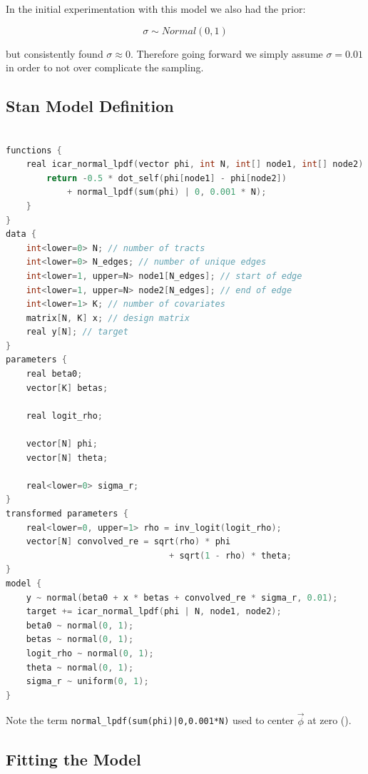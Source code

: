 \documentclass[11pt]{article}
\begin{document}
In the initial experimentation with this model we also had the prior:

$$\sigma \sim Normal(0,1)$$

but consistently found $\sigma \approx 0$. Therefore going forward we simply assume $\sigma=0.01$ in order to not over complicate the sampling. 

\newpage



\subsection{Stan Model Definition}\label{stanmodel}

\begin{lstlisting}[language=C++, basicstyle=\small]

functions {
    real icar_normal_lpdf(vector phi, int N, int[] node1, int[] node2) {
        return -0.5 * dot_self(phi[node1] - phi[node2]) 
            + normal_lpdf(sum(phi) | 0, 0.001 * N);
    }
}
data {
    int<lower=0> N; // number of tracts
    int<lower=0> N_edges; // number of unique edges
    int<lower=1, upper=N> node1[N_edges]; // start of edge
    int<lower=1, upper=N> node2[N_edges]; // end of edge
    int<lower=1> K; // number of covariates
    matrix[N, K] x; // design matrix
    real y[N]; // target
}
parameters {
    real beta0;
    vector[K] betas;

    real logit_rho;

    vector[N] phi;
    vector[N] theta;

    real<lower=0> sigma_r;
}
transformed parameters {
    real<lower=0, upper=1> rho = inv_logit(logit_rho);
    vector[N] convolved_re = sqrt(rho) * phi 
                                + sqrt(1 - rho) * theta;
}
model {
    y ~ normal(beta0 + x * betas + convolved_re * sigma_r, 0.01);
    target += icar_normal_lpdf(phi | N, node1, node2);
    beta0 ~ normal(0, 1);
    betas ~ normal(0, 1);
    logit_rho ~ normal(0, 1);
    theta ~ normal(0, 1);
    sigma_r ~ uniform(0, 1);
}

\end{lstlisting}

Note the term \verb+normal_lpdf(sum(phi)|0,0.001*N)+ used to center $\vec{\phi}$ at zero (\cite{bymstan}). 

\subsection{Fitting the Model}
\end{document}
